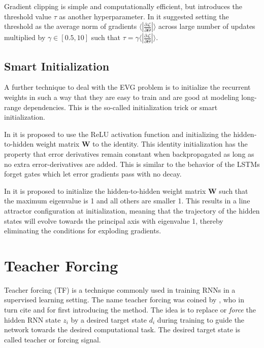 Gradient clipping is simple and computationally efficient, but introduces the threshold value $\tau$ as another hyperparameter. In \cite{pascanu2013difficulty}
it suggested setting the threshold as the average norm of gradients $\langle|\frac{\partial \mathcal{L}}{\partial \Theta}|\rangle$ across large number
of updates multiplied by $\gamma \in [0.5, 10]$ such that $\tau = \gamma \langle|\frac{\partial \mathcal{L}}{\partial \Theta}| \rangle$. 

\subsection{Smart Initialization}
A further technique to deal with the EVG problem is to initialize the recurrent weights in such a way that they are easy to train and are good at modeling
long-range dependencies. This is the so-called initialization trick or smart initialization.

In \cite{le2015simple} it is proposed to use the ReLU activation function and initializing the hidden-to-hidden weight matrix $\boldsymbol{W}$ 
to the identity. This identity initialization has the property that error derivatives remain constant when backpropagated as long as no extra 
error-derivatives are added. This is similar to the behavior of the LSTMs forget gates which let error gradients pass with no decay. 

In \cite{talathi2015improving} it is proposed to initialize the hidden-to-hidden weight matrix $\boldsymbol{W}$ such that the maximum eigenvalue is 1 
and all others are smaller 1. This results in a line attractor configuration at initialization, meaning that the trajectory of the hidden states will 
evolve towards the principal axis with eigenvalue 1, thereby eliminating the conditions for exploding gradients. 

\section{Teacher Forcing}
Teacher forcing (TF) is a technique commonly used in training RNNs in a supervised learning setting. The name teacher forcing was coined by
\cite{williams1989learning}, who in turn cite \cite{jordan1986attractor} and \cite{pineda1988dynamics} for first introducing the method.
The idea is to replace or \textit{force} the hidden RNN state $z_i$ by a desired target state $d_i$ during training to guide the network towards the desired 
computational task. The desired target state is called teacher or forcing signal.

